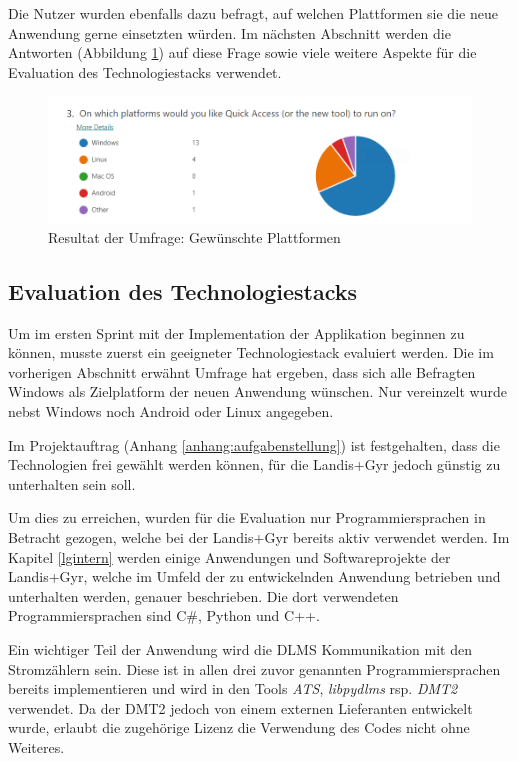Die Nutzer wurden ebenfalls dazu befragt, auf welchen Plattformen sie die neue Anwendung gerne einsetzten würden.
Im nächsten Abschnitt werden die Antworten (Abbildung \ref{fig:SurveryPlatforms}) auf diese Frage sowie viele weitere Aspekte für die Evaluation des Technologiestacks verwendet.

\begin{figure}[H]
   \centering
   \includegraphics[width=1.0\textwidth]{gfx/S0_Survey_Platform.png}
   \caption{
       Resultat der Umfrage: Gewünschte Plattformen
   }
   \label{fig:SurveryPlatforms}
\end{figure}

\subsection{Evaluation des Technologiestacks}
Um im ersten Sprint mit der Implementation der Applikation beginnen zu können, musste zuerst ein geeigneter Technologiestack evaluiert werden.
Die im vorherigen Abschnitt erwähnt Umfrage hat ergeben, dass sich alle Befragten Windows als Zielplatform der neuen Anwendung wünschen.
Nur vereinzelt wurde nebst Windows noch Android oder Linux angegeben.

Im Projektauftrag (Anhang \ref{anhang:aufgabenstellung}) ist festgehalten, dass die Technologien frei gewählt werden können, für die Landis+Gyr jedoch günstig zu unterhalten sein soll.

Um dies zu erreichen, wurden für die Evaluation nur Programmiersprachen in Betracht gezogen, welche bei der Landis+Gyr bereits aktiv verwendet werden.
Im Kapitel \ref{lgintern} werden einige Anwendungen und Softwareprojekte der Landis+Gyr, welche im Umfeld der zu entwickelnden Anwendung betrieben und unterhalten werden, genauer beschrieben.
Die dort verwendeten Programmiersprachen sind C\#, Python und C++.


Ein wichtiger Teil der Anwendung wird die \ac{DLMS} Kommunikation mit den Stromzählern sein.
Diese ist in allen drei zuvor genannten Programmiersprachen bereits implementieren und wird in den Tools \textit{\ac{ATS}}, \textit{libpydlms} rsp. \textit{\ac{DMT2}} verwendet.
Da der \ac{DMT2} jedoch von einem externen Lieferanten entwickelt wurde, erlaubt die zugehörige Lizenz die Verwendung des Codes nicht ohne Weiteres.


